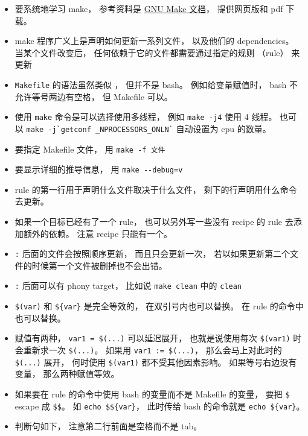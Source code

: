 


\begin{itemize}
\item 要系统地学习 make， 参考资料是 \href{https://www.gnu.org/software/make/manual/}{GNU Make 文档}， 提供网页版和 pdf 下载。
\item make 程序广义上是声明如何更新一系列文件， 以及他们的 dependencies。 当某个文件改变后， 任何依赖于它的文件都需要通过指定的规则 （rule） 来更新
\item \verb|Makefile| 的语法虽然类似 ， 但并不是 bash。 例如给变量赋值时， bash 不允许等号两边有空格， 但 Makefile 可以。
\item 使用 \verb|make| 命令是可以选择使用多线程， 例如 \verb|make -j4| 使用 4 线程。 也可以 \verb|make -j`getconf _NPROCESSORS_ONLN`| 自动设置为 cpu 的数量。
\item 要指定 Makefile 文件， 用 \verb|make -f 文件|
\item 要显示详细的推导信息， 用 \verb|make --debug=v|
\item rule 的第一行用于声明什么文件取决于什么文件， 剩下的行声明用什么命令去更新。
\item 如果一个目标已经有了一个 rule， 也可以另外写一些没有 recipe 的 rule 去添加额外的依赖。 注意 recipe 只能有一个。
\item \verb|:| 后面的文件会按照顺序更新， 而且只会更新一次， 若以如果更新第二个文件的时候第一个文件被删掉也不会出错。
\item \verb|:| 后面可以有 phony target， 比如说 \verb|make clean| 中的 \verb|clean|
\item \verb|$(var)| 和 \verb|${var}| 是完全等效的， 在双引号内也可以替换。 在 rule 的命令中也可以替换。
\item 赋值有两种， \verb|var1 = $(...)| 可以延迟展开， 也就是说使用每次 \verb|$(var1)| 时会重新求一次 \verb|$(...)|。 如果用 \verb|var1 := $(...)|， 那么会马上对此时的 \verb|$(...)| 展开， 何时使用 \verb|$(var1)| 都不受其他因素影响。 如果等号右边没有变量， 那么两种赋值等效。
\item 如果要在 rule 的命令中使用 bash 的变量而不是 Makefile 的变量， 要把 \verb|$| escape 成 \verb|$$|。 如 \verb|echo $${var}|， 此时传给 bash 的命令就是 \verb|echo ${var}|。
\item 判断句如下， 注意第二行前面是空格而不是 tab。

\end{itemize}

